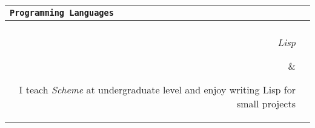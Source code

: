\documentclass{article}
\newcommand{\cvsectionname}[1]{\multicolumn{2}{l}{\Large \tt #1}\\\hline\\}
\newenvironment{cvsection}[1]{\medskip \begin{tabular}{rl} \cvsectionname{#1}}{\end{tabular}}
\newcommand{\cvline}[2]{\parbox[t]{2.3cm}{\sl  \hfill #1} & \parbox[t]{14cm}{ #2 \hfill}\\\vspace{4pt}}
\newcommand{\cvtechnicalline}[2]{\parbox[t]{2.3cm}{\sl #1} & \parbox[t]{14cm}{ #2 \hfill}\\\vspace{4pt}}
\newcommand{\cvlanguageline}[2]{\parbox[t]{2.48cm}{\sl #1} & \parbox[t]{14cm}{ #2 \hfill}\\\vspace{4pt}}
\begin{document}
%
%
%




\begin{cvsection}{Programming Languages} 
\cvlanguageline{Lisp} {I teach {\em Scheme} at undergraduate level and enjoy writing Lisp for small projects} %

\cvlanguageline{Smalltalk} {For the last three years I have been working with {\em Smalltalk} and I came to appreciate the flexibility of the language and it's simplicity. At the university of lugano I taught smalltalk during the Programming Fundamentals course.}

\cvlanguageline{Java} {During the university years, I wrote a compiler for a simplified version of Pascal and a simplle CRM application. During my 6 months of internship at IBM I developed an Eclipse plugin for visualizing large distributed systems specifications. I supervised a bachelor project implementing a software visualization plugin for the Eclipse IDE.}

\cvlanguageline{Other} {While working as a software developer at Computervoice Systems, I acquired in-depth knowledge of  {\em Visual C++} and MFC. I have taught {\em Pascal} at highschool level. Over the years I worked with many other languages: as Assembly, Prolog, Objective C, Ruby.}
\end{cvsection}
\end{document}
